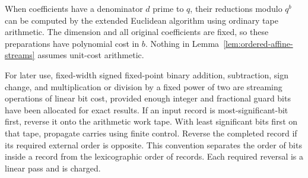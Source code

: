 When coefficients have a denominator $d$ prime to $q$, their reductions
modulo $q^b$ can be computed by the extended Euclidean algorithm using
ordinary tape arithmetic.  The dimension and all original coefficients
are fixed, so these preparations have polynomial cost in $b$.  Nothing
in Lemma~\ref{lem:ordered-affine-streams} assumes unit-cost arithmetic.

For later use, fixed-width signed fixed-point binary addition,
subtraction, sign change, and multiplication or division by a fixed
power of two are streaming operations of linear bit cost, provided
enough integer and fractional guard bits have been allocated for exact
results. If an input record is most-significant-bit first, reverse it onto
the arithmetic work tape. With least significant bits first on that tape,
propagate carries using finite control. Reverse the completed record if
its required external order is opposite.
This convention separates the order of bits inside a record from the
lexicographic order of records. Each required reversal is a linear pass
and is charged.
